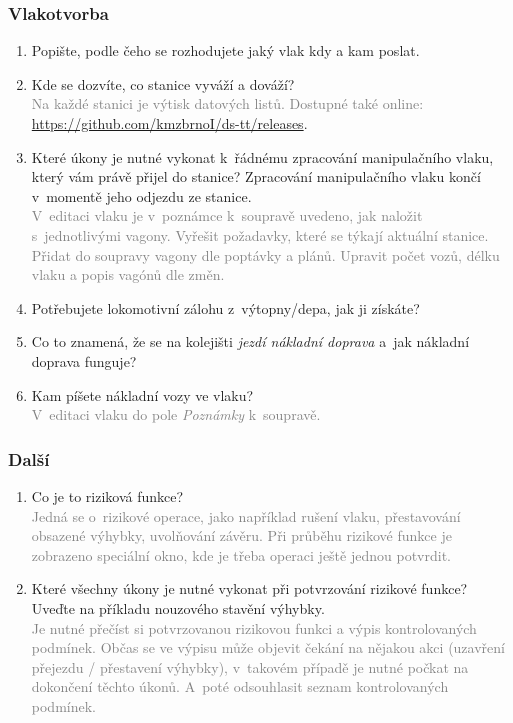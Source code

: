 \documentclass[12pt,a4paper]{article}
\newcommand{\solution}[1]{\\ \textcolor{gray}{#1}}
\newcommand{\solution}[1]{}
\begin{document}
\subsubsection*{Vlakotvorba}
\begin{enumerate}[leftmargin=*]
\item Popište, podle čeho se rozhodujete jaký vlak kdy a kam poslat.

\item Kde se dozvíte, co stanice vyváží a dováží?
\solution{Na každé stanici je výtisk datových listů. Dostupné také online:\\
\url{https://github.com/kmzbrnoI/ds-tt/releases}}.

\item Které úkony je nutné vykonat k~řádnému zpracování manipulačního vlaku,
který vám právě přijel do stanice? Zpracování manipulačního vlaku končí
v~momentě jeho odjezdu ze stanice.
\solution{V~editaci vlaku je v~poznámce k~soupravě uvedeno, jak naložit
s~jednotlivými vagony. Vyřešit požadavky, které se týkají aktuální stanice.
Přidat do soupravy vagony dle poptávky a plánů. Upravit počet vozů, délku
vlaku a popis vagónů dle změn.}

\item Potřebujete lokomotivní zálohu z~výtopny/depa, jak ji získáte?

\item Co to znamená, že se na kolejišti \textit{jezdí nákladní doprava} a~jak
nákladní doprava funguje?

\item Kam píšete nákladní vozy ve vlaku?
\solution{V~editaci vlaku do pole \textit{Poznámky} k~soupravě.}

\end{enumerate}

\subsubsection*{Další}
\begin{enumerate}[leftmargin=*]
\item Co je to riziková funkce?
\solution{Jedná se o~rizikové operace, jako například rušení vlaku,
přestavování obsazené výhybky, uvolňování závěru. Při průběhu rizikové funkce
je zobrazeno speciální okno, kde je třeba operaci ještě jednou potvrdit.}

\item Které všechny úkony je nutné vykonat při potvrzování rizikové funkce?
Uveďte na příkladu nouzového stavění výhybky.
\solution{Je nutné přečíst si potvrzovanou rizikovou funkci a výpis
kontrolovaných podmínek. Občas se ve výpisu může objevit čekání na nějakou
akci (uzavření přejezdu / přestavení výhybky), v~takovém případě je nutné
počkat na dokončení těchto úkonů. A~poté odsouhlasit seznam kontrolovaných
podmínek.}

\end{enumerate}
\end{document}
